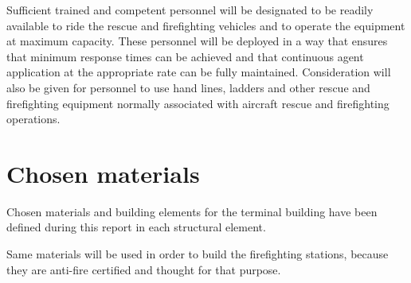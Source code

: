 	Sufficient trained and competent personnel will be designated to be readily available to ride the rescue and firefighting vehicles and to operate the equipment at maximum capacity. These personnel will be deployed in a way that ensures that minimum response times can be achieved and that continuous agent application at the appropriate rate can be fully maintained. Consideration will also be given for personnel to use hand lines, ladders and other rescue and firefighting equipment normally associated with aircraft rescue and firefighting operations.
	
\section{Chosen materials}
Chosen materials and building elements for the terminal building have been defined during this report in each structural element. 

Same materials will be used in order to build the firefighting stations, because they are anti-fire certified and thought for that purpose.

		